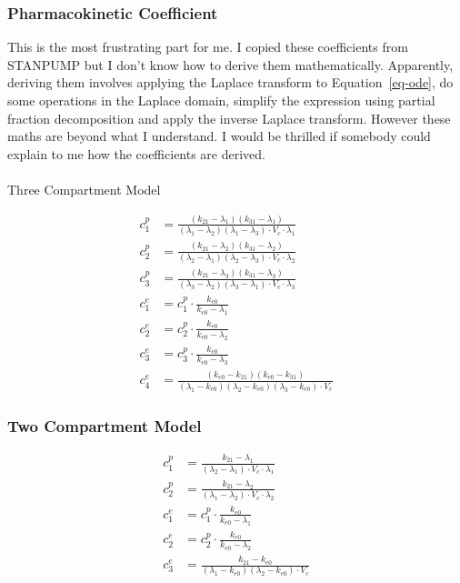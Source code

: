 \documentclass[
  letterpaper,
  DIV=11,
  numbers=noendperiod]{scrartcl}
\makeatletter
\let\oldparagraph\paragraph
\renewcommand{\paragraph}{
    \@ifstar
      \xxxParagraphStar
      \xxxParagraphNoStar
  }
\newcommand{\xxxParagraphStar}[1]{\oldparagraph*{#1}\mbox{}}
\newcommand{\xxxParagraphNoStar}[1]{\oldparagraph{#1}\mbox{}}
\makeatother
\begin{document}
\subsubsection{Pharmacokinetic
Coefficient}\label{pharmacokinetic-coefficient}

This is the most frustrating part for me. I copied these coefficients
from STANPUMP but I don't know how to derive them mathematically.
Apparently, deriving them involves applying the Laplace transform to
Equation~\ref{eq-ode}, do some operations in the Laplace domain,
simplify the expression using partial fraction decomposition and apply
the inverse Laplace transform. However these maths are beyond what I
understand. I would be thrilled if somebody could explain to me how the
coefficients are derived.

\paragraph{Three Compartment Model}\label{three-compartment-model}

\[
\begin{equation}
\begin{aligned}
c^p_1 & = \frac{(k_{21} - \lambda_1)(k_{31} - \lambda_1)}{(\lambda_1 - \lambda_2)(\lambda_1 - \lambda_3) \cdot V_c \cdot \lambda_1}
\\
c^p_2 & = \frac{(k_{21} - \lambda_2)(k_{31} - \lambda_2)}{(\lambda_2 - \lambda_1)(\lambda_2 - \lambda_3) \cdot V_c \cdot \lambda_2}
\\
c^p_3 & = \frac{(k_{21} - \lambda_3)(k_{31} - \lambda_3)}{(\lambda_3 - \lambda_2)(\lambda_3 - \lambda_1) \cdot V_c \cdot \lambda_3}
\\
c^e_1 & = c^p_1 \cdot \frac{k_{e0}}{k_{e0} - \lambda_1}
\\
c^e_2 & = c^p_2 \cdot \frac{k_{e0}}{k_{e0} - \lambda_2}
\\
c^e_3 & = c^p_3 \cdot \frac{k_{e0}}{k_{e0} - \lambda_3}
\\
c^e_4 & = \frac{(k_{e0} - k_{21})(k_{e0} - k_{31})}{(\lambda_1 - k_{e0})(\lambda_2 - k_{e0})(\lambda_3 - k_{e0}) \cdot V_c}
\end{aligned}
\end{equation}
\]

\subsubsection{Two Compartment Model}\label{two-compartment-model}

\[
\begin{equation}
\begin{aligned}
c^p_1 & = \frac{k_{21} - \lambda_1}{(\lambda_2 - \lambda_1) \cdot V_c \cdot \lambda_1}
\\
c^p_2 & = \frac{k_{21} - \lambda_2}{(\lambda_1 - \lambda_2) \cdot V_c \cdot \lambda_2}
\\
c^e_1 & = c^p_1 \cdot \frac{k_{e0}}{k_{e0} - \lambda_1}
\\
c^e_2 & = c^p_2 \cdot \frac{k_{e0}}{k_{e0} - \lambda_2}
\\
c^e_3 & = \frac{k_{21} - k_{e0}}{(\lambda_1 - k_{e0})(\lambda_2 - k_{e0}) \cdot V_c}
\end{aligned}
\end{equation}
\]
\end{document}
